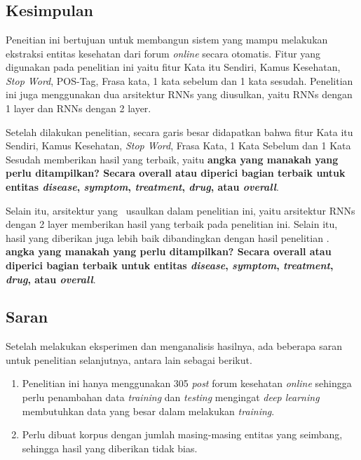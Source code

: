 \chapter{\babEnam}

\section{Kesimpulan}
Peneitian ini bertujuan untuk membangun sistem yang mampu melakukan ekstraksi entitas kesehatan dari forum \textit{online} secara otomatis. Fitur yang digunakan pada penelitian ini yaitu fitur Kata itu Sendiri, Kamus Kesehatan, \textit{Stop Word}, POS-Tag, Frasa kata,  1 kata sebelum dan 1 kata sesudah. Penelitian ini juga menggunakan dua arsitektur RNNs yang diusulkan, yaitu RNNs dengan 1 layer dan RNNs dengan 2 layer.

Setelah dilakukan penelitian, secara garis besar didapatkan bahwa fitur Kata itu Sendiri, Kamus Kesehatan, \textit{Stop Word}, Frasa Kata,  1 Kata Sebelum dan 1 Kata Sesudah memberikan hasil yang terbaik, yaitu \textbf{angka yang manakah yang perlu ditampilkan? Secara overall atau diperici bagian terbaik untuk entitas \textit{disease}, \textit{symptom}, \textit{treatment}, \textit{drug}, atau \textit{overall}}.

Selain itu, arsitektur yang \saya~usaulkan dalam penelitian ini, yaitu arsitektur RNNs dengan 2 layer memberikan hasil yang terbaik pada penelitian ini. Selain itu, hasil yang diberikan juga lebih baik dibandingkan dengan hasil penelitian \cite{skripsiKakRadit}. \textbf{angka yang manakah yang perlu ditampilkan? Secara overall atau diperici bagian terbaik untuk entitas \textit{disease}, \textit{symptom}, \textit{treatment}, \textit{drug}, atau \textit{overall}}.

\section{Saran}
Setelah melakukan eksperimen dan menganalisis hasilnya, ada beberapa saran untuk penelitian selanjutnya, antara lain sebagai berikut.

\begin{enumerate}
  \item Penelitian ini hanya menggunakan 305 \textit{post} forum kesehatan \textit{online} sehingga perlu penambahan data \textit{training} dan \textit{testing} mengingat \textit{deep learning} membutuhkan data yang besar dalam melakukan \textit{training}.

  \item Perlu dibuat korpus dengan jumlah masing-masing entitas yang seimbang, sehingga hasil yang diberikan tidak bias.

\end{enumerate}
